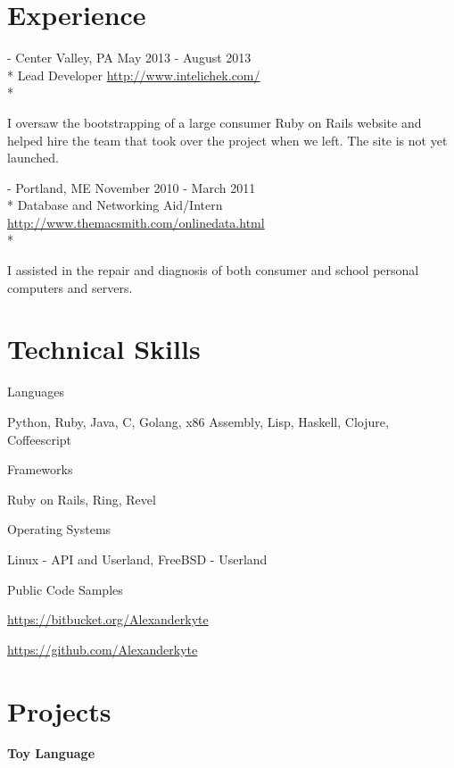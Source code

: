 \documentclass[letter,margin,line]{resume}
\newcommand{\rurl}[1]{\hfill {\footnotesize \url{#1}}}
\newcommand{\rdate}[1]{\hfill {\small #1}}
\renewcommand{\employer}[5]{\item[#1] - #2 \rdate{#3} \\* #4 \rurl{#5} \\*}
\begin{document}
\begin{resume}
\section{\mysidestyle Experience}
	\begin{asparadesc}
		\employer{Intelichek}{Center Valley, PA}{May 2013 - August 2013}{Lead Developer}{http://www.intelichek.com/}
		\item\small I oversaw the bootstrapping of a large consumer Ruby on Rails website and helped hire the team that took over the project when we left. The site is not yet launched.
		\normalsize
		\\	
	\end{asparadesc}
	\begin{asparadesc}
		\employer{MacSmith}{Portland, ME}{November 2010 - March 2011}{Database and Networking Aid/Intern}{http://www.themacsmith.com/onlinedata.html}
		\item\small I assisted in the repair and diagnosis of both consumer and school personal computers and servers.
		\normalsize
		\\	
	\end{asparadesc}

\section{\mysidestyle Technical Skills}
	\begin{compactdesc}
		\item[Languages]
			\small\item Python, Ruby, Java, C, Golang, x86 Assembly, Lisp, Haskell, Clojure, Coffeescript
		\item[Frameworks]
			\small\item Ruby on Rails, Ring, Revel
		\item[Operating Systems]
			\small\item Linux - API and Userland, FreeBSD - Userland
		\item[Public Code Samples]
			\small\item\href{https://bitbucket.org/Alexanderkyte}{https://bitbucket.org/Alexanderkyte} \hfill
			\small\item\href{https://github.com/alexanderkyte}{https://github.com/Alexanderkyte} \hfill
	\end{compactdesc}
	
	
\section{\mysidestyle Projects}
	\begin{asparablank}
		\item {\bf Toy Language}
		

\end{asparablank}
\end{resume}
\end{document}
